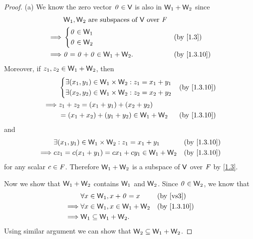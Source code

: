 \begin{proof}{(a)}
  We know the zero vector \(\mathit{0} \in \mathsf{V}\) is also in \(\mathsf{W}_1 + \mathsf{W}_2\) since
  \begin{align*}
             & \W_1, \W_2 \text{ are subspaces of } \V \text{ over } \F                                \\
    \implies & \begin{dcases}
      \zv \in \W_1 \\
      \zv \in \W_2
    \end{dcases}                               &  & \text{(by \cref{1.3})}    \\
    \implies & \zv = \zv + \zv \in \W_1 + \W_2.                         &  & \text{(by \cref{1.3.10})}
  \end{align*}
  Moreover, if \(z_1, z_2 \in \mathsf{W}_1 + \mathsf{W}_2\), then
  \begin{align*}
             & \begin{dcases}
      \exists (x_1, y_1) \in \W_1 \times \W_2 : z_1 = x_1 + y_1 \\
      \exists (x_2, y_2) \in \W_1 \times \W_2 : z_2 = x_2 + y_2
    \end{dcases}                  &  & \text{(by \cref{1.3.10})} \\
    \implies & z_1 + z_2 = (x_1 + y_1) + (x_2 + y_2)                                      \\
             & = (x_1 + x_2) + (y_1 + y_2) \in \W_1 + \W_2 &  & \text{(by \cref{1.3.10})}
  \end{align*}
  and
  \begin{align*}
             & \exists (x_1, y_1) \in \W_1 \times \W_2 : z_1 = x_1 + y_1 &  & \text{(by \cref{1.3.10})} \\
    \implies & cz_1 = c(x_1 + y_1) = cx_1 + cy_1 \in \W_1 + \W_2         &  & \text{(by \cref{1.3.10})}
  \end{align*}
  for any scalar \(c \in \mathit{F}\).
  Therefore \(\mathsf{W}_1 + \mathsf{W}_2\) is a subspace of \(\mathsf{V}\) over \(\mathit{F}\) by \cref{1.3}.

  Now we show that \(\mathsf{W}_1 + \mathsf{W}_2\) contains \(\mathsf{W}_1\) and \(\mathsf{W}_2\).
  Since \(\mathit{0} \in \mathsf{W}_2\), we know that
  \begin{align*}
             & \forall x \in \W_1, x + \zv = x       &  & \text{(by \ref{vs3})}     \\
    \implies & \forall x \in \W_1, x \in \W_1 + \W_2 &  & \text{(by \cref{1.3.10})} \\
    \implies & \W_1 \subseteq \W_1 + \W_2.
  \end{align*}
  Using similar argument we can show that \(\mathsf{W}_2 \subseteq \mathsf{W}_1 + \mathsf{W}_2\).
\end{proof}


